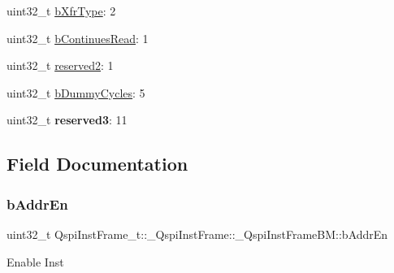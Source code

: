\begin{DoxyCompactItemize}
\item 
uint32\+\_\+t \mbox{\hyperlink{structQspiInstFrame__t_1_1__QspiInstFrame_1_1__QspiInstFrameBM_ad4687f1d6cccdea06d62bc420d9d92cf}{b\+Xfr\+Type}}\+: 2
\item 
uint32\+\_\+t \mbox{\hyperlink{structQspiInstFrame__t_1_1__QspiInstFrame_1_1__QspiInstFrameBM_af8db0340a7fa2e265cb9b7333ecd7ffe}{b\+Continues\+Read}}\+: 1
\item 
uint32\+\_\+t \mbox{\hyperlink{structQspiInstFrame__t_1_1__QspiInstFrame_1_1__QspiInstFrameBM_a39bfa8c151943973f91f3ee7a342b721}{reserved2}}\+: 1
\item 
uint32\+\_\+t \mbox{\hyperlink{structQspiInstFrame__t_1_1__QspiInstFrame_1_1__QspiInstFrameBM_ab36270de6400f196fa9b71fd7fed1d46}{b\+Dummy\+Cycles}}\+: 5
\item 
\mbox{\label{structQspiInstFrame__t_1_1__QspiInstFrame_1_1__QspiInstFrameBM_a5c7b490438aa2f534fd876e3508fb4d4}} 
uint32\+\_\+t {\bfseries reserved3}\+: 11
\end{DoxyCompactItemize}


\subsection{Field Documentation}
\mbox{\label{structQspiInstFrame__t_1_1__QspiInstFrame_1_1__QspiInstFrameBM_af300ab76db59cc1191f2791de1b6f87a}} 
\subsubsection{\texorpdfstring{bAddrEn}{bAddrEn}}
{\footnotesize\ttfamily uint32\+\_\+t Qspi\+Inst\+Frame\+\_\+t\+::\+\_\+\+Qspi\+Inst\+Frame\+::\+\_\+\+Qspi\+Inst\+Frame\+B\+M\+::b\+Addr\+En}

Enable Inst \mbox{\label{structQspiInstFrame__t_1_1__QspiInstFrame_1_1__QspiInstFrameBM_a0c85f37fb4a4fb8010920063c82eb24b}} 
